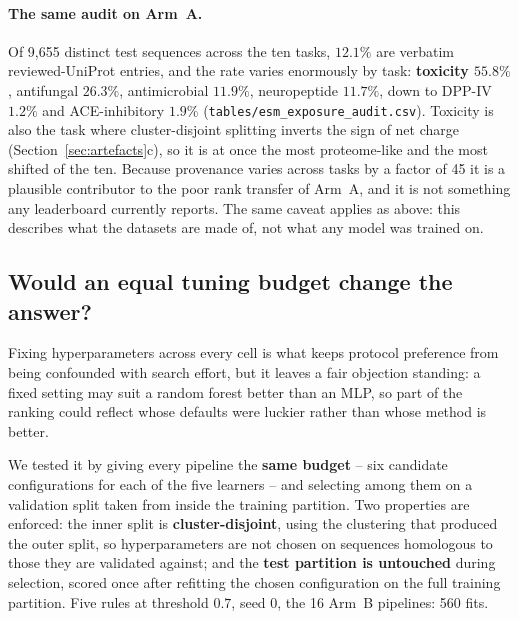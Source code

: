 \documentclass[11pt,a4paper]{article}
\begin{document}
\paragraph{The same audit on Arm~A.} Of 9{,}655 distinct test sequences across the ten
tasks, $12.1\%$ are verbatim reviewed-UniProt entries, and the rate varies enormously by
task: \textbf{toxicity $55.8\%$}, antifungal $26.3\%$, antimicrobial $11.9\%$, neuropeptide
$11.7\%$, down to DPP-IV $1.2\%$ and ACE-inhibitory $1.9\%$
(\texttt{tables/esm\_exposure\_audit.csv}). Toxicity is also the task where cluster-disjoint
splitting inverts the sign of net charge (Section~\ref{sec:artefacts}c), so it is at once the
most proteome-like and the most shifted of the ten. Because provenance varies across tasks by
a factor of 45 it is a plausible contributor to the poor rank transfer of Arm~A, and it is
not something any leaderboard currently reports. The same caveat applies as above: this
describes what the datasets are made of, not what any model was trained on.

\subsection{Would an equal tuning budget change the answer?}
\label{sec:tuning}

Fixing hyperparameters across every cell is what keeps protocol preference from
being confounded with search effort, but it leaves a fair objection standing: a fixed
setting may suit a random forest better than an MLP, so part of the ranking could reflect
whose defaults were luckier rather than whose method is better.

We tested it by giving every pipeline the \textbf{same budget} -- six candidate
configurations for each of the five learners -- and selecting among them on a validation
split taken from inside the training partition. Two properties are enforced: the inner
split is \textbf{cluster-disjoint}, using the clustering that produced the outer split, so
hyperparameters are not chosen on sequences homologous to those they are validated against;
and the \textbf{test partition is untouched} during selection, scored once after refitting
the chosen configuration on the full training partition. Five rules at threshold $0.7$,
seed $0$, the 16 Arm~B pipelines: 560 fits.
\end{document}

